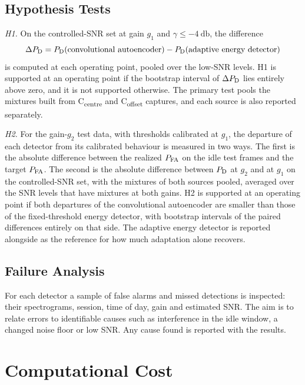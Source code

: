 \subsection{Hypothesis Tests}
\label{sec:m-hypotheses}

\emph{H1.} On the controlled-SNR set at gain $g_1$ and $\gamma \le \qty{-4}{\decibel}$, the difference
\begin{equation}
  \Delta P_{\mathrm{D}} = P_{\mathrm{D}}(\text{convolutional autoencoder}) - P_{\mathrm{D}}(\text{adaptive energy detector})
  \label{eq:m-h1}
\end{equation}
is computed at each operating point, pooled over the low-SNR levels. H1 is supported at an operating point if the  bootstrap interval of $\Delta P_{\mathrm{D}}$ lies entirely above zero, and it is not supported otherwise. The primary test pools the mixtures built from C\textsubscript{centre} and C\textsubscript{offset} captures, and each source is also reported separately.

\emph{H2.} For the gain-$g_2$ test data, with thresholds calibrated at $g_1$, the departure of each detector from its calibrated behaviour is measured in two ways. The first is the absolute difference between the realized $P_{\mathrm{FA}}$ on the idle test frames and the target $P_{\mathrm{FA}}$. The second is the absolute difference between $P_{\mathrm{D}}$ at $g_2$ and at $g_1$ on the controlled-SNR set, with the mixtures of both sources pooled, averaged over the SNR levels that have mixtures at both gains. H2 is supported at an operating point if both departures of the convolutional autoencoder are smaller than those of the fixed-threshold energy detector, with  bootstrap intervals of the paired differences entirely on that side. The adaptive energy detector is reported alongside as the reference for how much adaptation alone recovers.

\subsection{Failure Analysis}
\label{sec:m-failures}

For each detector a sample of false alarms and missed detections is inspected: their spectrograms, session, time of day, gain and estimated SNR. The aim is to relate errors to identifiable causes such as interference in the idle window, a changed noise floor or low SNR. Any cause found is reported with the results.

\section{Computational Cost}
\label{sec:m-compute}

